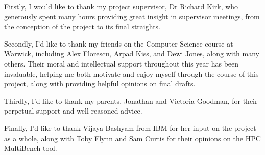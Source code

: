 Firstly, I would like to thank my project supervisor, Dr Richard Kirk, who generously spent many hours providing great insight in supervisor meetings, from the conception of the project to its final straights.

Secondly, I'd like to thank my friends on the Computer Science course at Warwick, including Alex Florescu, Arpad Kiss, and Dewi Jones, along with many others. Their moral and intellectual support throughout this year has been invaluable, helping me both motivate and enjoy myself through the course of this project, along with providing helpful opinions on final drafts.

Thirdly, I'd like to thank my parents, Jonathan and Victoria Goodman, for their perpetual support and well-reasoned advice.

Finally, I'd like to thank Vijaya Bashyam from IBM for her input on the project as a whole, along with Toby Flynn and Sam Curtis for their opinions on the HPC MultiBench tool. %

\vspace*{\fill}